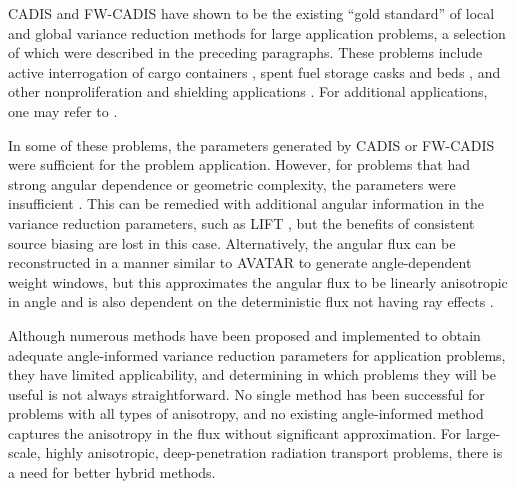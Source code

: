 CADIS and FW-CADIS have shown to be the existing ``gold standard'' of local and
global variance reduction methods for large application problems, a selection
of which were described in the preceding paragraphs.
These problems include active interrogation of cargo containers
\cite{mosher_automated_2009}, spent fuel storage casks \cite{chen_surface_2011,
radulescu_dose_2013}
and beds \cite{sheu_dose_2011}, and other nonproliferation and shielding applications
\cite{somasundaram_implementation_2013}. For additional
applications, one may refer to \cite{wagner_review_2011}.

In some of these problems, the
parameters generated by CADIS or FW-CADIS were sufficient for the problem
application. However, for problems that had strong angular dependence or geometric
complexity, the parameters were insufficient \cite{chen_surface_2011,
somasundaram_implementation_2013, peplow_consistent_2012}.
This can be remedied with additional angular
information in the variance reduction parameters, such as LIFT
\cite{somasundaram_implementation_2013}, but the benefits of consistent source
biasing are lost in this case. Alternatively, the angular flux can be
reconstructed in a manner similar to AVATAR
\cite{sweezy_automated_2005, peplow_consistent_2012} to generate angle-dependent
weight windows, but this approximates the angular flux to be linearly
anisotropic in angle and is also dependent on
the deterministic flux not having ray
effects \cite{sweezy_automated_2005}. 

Although numerous methods have been
proposed and implemented to obtain adequate angle-informed variance reduction
parameters for application problems, they have limited applicability,
 and determining in which problems they will be
useful is not always straightforward. No single method has been successful
for problems with all types of anisotropy, and no existing angle-informed method
captures the anisotropy in the flux without significant approximation. For
large-scale, highly anisotropic, deep-penetration radiation transport problems,
there is a need for better hybrid methods.


